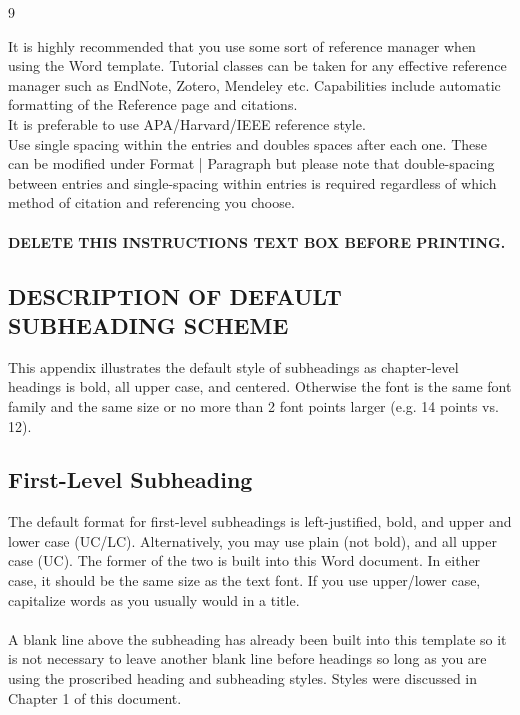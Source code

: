 \documentclass[a4paper,12pt,one side]{report}
\theoremstyle{definition}
\begin{document}
\begin{justify}
   \begin{thebibliography}{9}
		\end{thebibliography}
\begin{tcolorbox}[enhanced jigsaw,
    sharp corners,
    boxrule=0.5pt, 
    colback=blue!30!white,   
    borderline={0.5pt}{-2pt}{black,solid} %
 ]
 \begin{justify}
It is highly recommended that you use some sort of reference manager when using the Word template. Tutorial classes can be taken for any effective reference manager such as EndNote, Zotero, Mendeley etc. Capabilities include automatic formatting of the Reference page and citations.\\
It is preferable to use APA/Harvard/IEEE reference style.\\
Use single spacing within the entries and doubles spaces after each one. These can be modified under Format | Paragraph but please note that double-spacing between entries and single-spacing within entries is required regardless of which method of citation and referencing you choose.\\~\\
\bf{DELETE THIS INSTRUCTIONS TEXT BOX BEFORE PRINTING.}
\end{justify}
\end{tcolorbox}
\begin{appendix}
    \begin{center}
\chapter {DESCRIPTION OF DEFAULT SUBHEADING SCHEME}
\end{center}
This appendix illustrates the default style of subheadings as chapter-level headings is bold, all upper case, and centered. Otherwise the font is the same font family and the same size or no more than 2 font points larger (e.g. 14 points vs. 12).
\section{First-Level Subheading}
The default format for first-level subheadings is left-justified, bold, and upper and lower case (UC/LC). Alternatively, you may use plain (not bold), and all upper case (UC).  The former of the two is built into this Word document. In either case, it should be the same size as the text font.  If you use upper/lower case, capitalize words as you usually would in a title.\\~\\
	A blank line above the subheading has already been built into this template so it is not necessary to leave another blank line before headings so long as you are using the proscribed heading and subheading styles. Styles were discussed in Chapter 1 of this document.

\end{appendix}
\end{justify}
\end{document}
